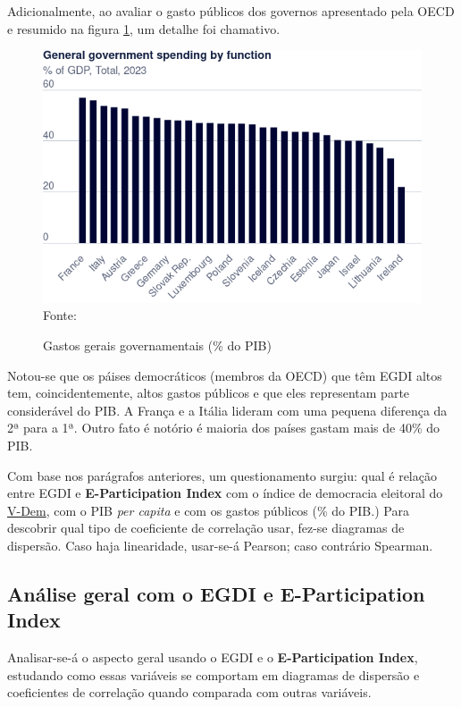 Adicionalmente, ao avaliar o gasto públicos dos governos apresentado pela OECD e resumido na figura \ref{fig:government-spending-by-function}, um detalhe foi chamativo.

\begin{figure}[H]
	\centering
	\caption{Gastos gerais governamentais (\% do PIB)}
	\includegraphics[width=1\linewidth]{figuras/government_spending/government-spending-by-function}
	\label{fig:government-spending-by-function}
	\footnotesize{Fonte: \cite{global_gov_spending_function}}
\end{figure}

Notou-se que os páises democráticos (membros da OECD) que têm EGDI altos tem, coincidentemente, altos gastos públicos e que eles representam parte considerável do PIB. A França e a Itália lideram com uma pequena diferença da 2ª para a 1ª. Outro fato é notório é maioria dos países gastam mais de 40\% do PIB.

Com base nos parágrafos anteriores, um questionamento surgiu: qual é relação entre EGDI e \textbf{E-Participation Index} com o índice de democracia eleitoral do \href{https://www.v-dem.net/}{V-Dem}, com o PIB \textit{per capita} e com os gastos públicos (\% do PIB.) Para descobrir qual tipo de coeficiente de correlação usar, fez-se diagramas de dispersão. Caso haja linearidade, usar-se-á Pearson; caso contrário Spearman.

\subsection{Análise geral com o EGDI e E-Participation Index}

Analisar-se-á o aspecto geral usando o EGDI e o \textbf{E-Participation Index}, estudando como essas variáveis se comportam em diagramas de dispersão e coeficientes de correlação quando comparada com outras variáveis.

